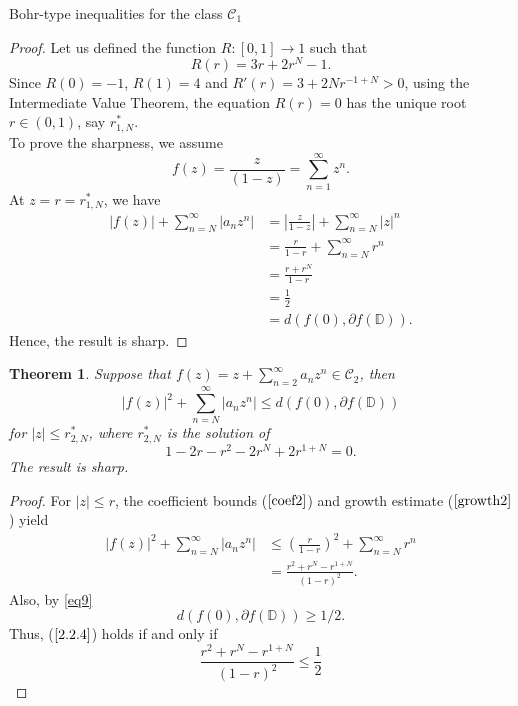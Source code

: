 \documentclass[12pt,a4paper,reqno]{amsart}
\theoremstyle{definition}
\theoremstyle{plain}
\newtheorem{theorem}[definition]{Theorem}
\numberwithin{equation}{section}
\begin{document}
\begin{section}{Bohr-type inequalities for the class $\mathcal{C}_1$}
\begin{proof}
Let us defined the function $R:[0, 1]\rightarrow 1$  such that
\begin{equation*}
R(r)= 3 r + 2 r^N-1.
\end{equation*}
Since $R(0)=-1$, $R(1)=4$ and $R'(r)=3+2 N r^{-1+N}>0$, using the  Intermediate Value Theorem, the equation $R(r)=0$ has the unique root $r\in(0, 1)$, say  $r^*_{1,N}$.
\\
\noindent
To prove the sharpness, we assume
\begin{equation*}
    f(z)=\frac{z}{(1-z)}=\sum_{n=1}^{\infty} z^n.
\end{equation*}
At $z=r=r^*_{1,N}$, we have
\begin{align*}
|f(z)|+ \sum_{n=N}^{\infty} |a_n z^n|&= \left| \frac{z}{1-z} \right|+ \sum_{n=N}^{\infty} |z|^n\\
&=\frac{r}{1-r}+ \sum_{n=N}^{\infty} r^n\\
&=\frac{r+r^N}{1-r}\\
&=\frac{1}{2}\\
&=d(f(0), \partial{f(\mathbb{D})}).
\end{align*}
Hence, the result is sharp.
\end{proof}
\begin{theorem}
Suppose that $f(z)=z + \sum_{n=2}^{\infty} a_n z^n \in \mathcal{C}_2$, then
\begin{equation} \label{2.2.4}
|f(z)|^2+ \sum_{n=N}^{\infty} |a_n z^n|  \le d(f(0), \partial{f(\mathbb{D})})
\end{equation}
for $|z| \le r^*_{2,N}$, where $r^*_{2,N}$ is the solution of
\begin{equation}\label{eq21}
1-2 r-r^2-2 r^N+2 r^{1+N}=0.
\end{equation}
The result is sharp.
\end{theorem}
\begin{proof}For $|z| \le r$,
the coefficient bounds  ($\ref{coef2}$) and growth estimate  ($\ref{growth2}$) yield
\begin{align*}
|f(z)|^2+ \sum_{n=N}^{\infty} |a_n z^n|&  \le \left( \frac{r}{1-r} \right)^2 + \sum_{n=N}^{\infty} r^{n}\nonumber\\
&=\frac{r^2+r^N-r^{1+N}}{(1-r)^2}.
\end{align*}
Also, by \eqref{eq9}
\[
d(f(0), \partial{f(\mathbb{D})}) \ge 1/2.
\]
Thus, ($\ref{2.2.4}$) holds if and only if
\begin{equation*}
 \frac{r^2+r^N-r^{1+N}}{(1-r)^2}   \le   \frac{1}{2}
\end{equation*}

\end{proof}
\end{section}
\end{document}
